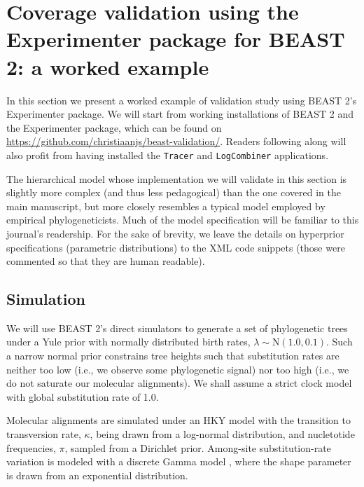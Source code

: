 \documentclass[oneside]{article}
\begin{document}
\newpage

\section{Coverage validation using the Experimenter package for BEAST 2: a worked example}

\indent In this section we present a worked example of validation study using BEAST 2's Experimenter package.
We will start from working installations of BEAST 2 and the Experimenter package, which can be found on \url{https://github.com/christiaanjs/beast-validation/}.
Readers following along will also profit from having installed the \texttt{Tracer} \citep{tracer} and \texttt{LogCombiner} applications.

The hierarchical model whose implementation we will validate in this section is slightly more complex (and thus less pedagogical) than the one covered in the main manuscript, but more closely resembles a typical model employed by empirical phylogeneticists.
Much of the model specification will be familiar to this journal's readership.
For the sake of brevity, we leave the details on hyperprior specifications (parametric distributions) to the XML code snippets (those were commented so that they are human readable).

\subsection{Simulation}

\indent We will use BEAST 2's direct simulators to generate a set of phylogenetic trees under a Yule prior with normally distributed birth rates, $\lambda \sim \text{N}(1.0, 0.1)$.
Such a narrow normal prior constrains tree heights such that substitution rates are neither too low (i.e., we observe some phylogenetic signal) nor too high (i.e., we do not saturate our molecular alignments).
We shall assume a strict clock model with global substitution rate of 1.0.

Molecular alignments are simulated under an HKY model \citep{hky} with the transition to transversion rate, $\kappa$, being drawn from a log-normal distribution, and nucletotide frequencies, $\pi$, sampled from a Dirichlet prior.
Among-site substitution-rate variation is modeled with a discrete Gamma model \citep{yang94}, where the shape parameter is drawn from an exponential distribution.

\vspace{.25cm}
\end{document}

